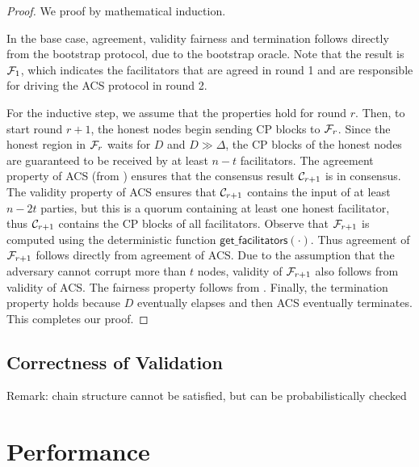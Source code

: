 \begin{proof}
We proof by mathematical induction.

In the base case, agreement, validity fairness and termination follows directly from the bootstrap protocol, due to the bootstrap oracle.
Note that the result is $\mathcal{F}_1$, which indicates the facilitators that are agreed in round 1 and are responsible for driving the ACS protocol in round 2.

For the inductive step, we assume that the properties hold for round $r$.
Then, to start round $r + 1$, the honest nodes begin sending CP blocks to $\mathcal{F}_r$. %
Since the honest region in $\mathcal{F}_r$ waits for $D$ and $D \gg \Delta$,
the CP blocks of the honest nodes are guaranteed to be received by at least $n - t$ facilitators.
The agreement property of ACS (from ) ensures that the consensus result $\mathcal{C}_{r + 1}$ is in consensus. 
The validity property of ACS ensures that $\mathcal{C}_{r + 1}$ contains the input of at least $n - 2t$ parties, but this is a quorum containing at least one honest facilitator,
thus $\mathcal{C}_{r + 1}$ contains the CP blocks of all facilitators.
Observe that $\mathcal{F}_{r + 1}$ is computed using the deterministic function $\textsf{get\_facilitators}(\cdot)$.
Thus agreement of $\mathcal{F}_{r + 1}$ follows directly from agreement of ACS.
Due to the assumption that the adversary cannot corrupt more than $t$ nodes,
validity of $\mathcal{F}_{r + 1}$ also follows from validity of ACS.
The fairness property follows from .
Finally, the termination property holds because $D$ eventually elapses and then ACS eventually terminates.
This completes our proof.


\end{proof}


\subsection{Correctness of Validation}

Remark: chain structure cannot be satisfied, but can be probabilistically checked

\section{Performance}